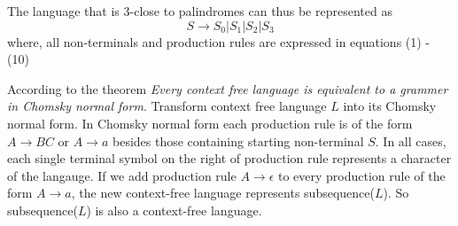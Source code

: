 \documentclass[12pt,a4paper]{article}
\newcommand{\question}[1]{\bigskip\noindent{\textbf{Q{#1} solution}}}
\begin{document}
The language that is 3-close to palindromes can thus be represented as
$$
  S \rightarrow S_0 | S_1 | S_2 | S_3
$$
where, all non-terminals and production rules are expressed in equations (1) - (10)



\question{12.B}

According to the theorem {\em Every context free language is equivalent to a grammer in Chomsky normal form}\cite{model}. Transform context free language $L$ into its Chomsky normal form. In Chomsky normal form each production rule is of the form $A\rightarrow BC \mbox{ or } A\rightarrow a$ besides those containing starting non-terminal $S$. In all cases, each single terminal symbol on the right of production rule represents a character of the langauge. If we add production rule $A\rightarrow \epsilon$ to every production rule of the form $A\rightarrow a$, the new context-free language represents subsequence($L$). So subsequence($L$) is also a context-free language.




\end{document}
